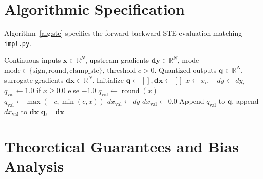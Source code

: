 \documentclass[11pt]{article}
\begin{document}
\section{Algorithmic Specification}
\label{sec:algorithm}

Algorithm~\ref{alg:ste} specifies the forward-backward STE evaluation matching \texttt{impl.py}.

\begin{algorithm}[H]
\caption{Straight-Through Estimator (STE) Evaluation}
\label{alg:ste}
\begin{algorithmic}[1]
\Require Continuous inputs $\mathbf{x} \in \mathbb{R}^N$, upstream gradients $\mathbf{dy} \in \mathbb{R}^N$, mode $\mathrm{mode} \in \{\text{sign}, \text{round}, \text{clamp\_ste}\}$, threshold $c > 0$.
\Ensure Quantized outputs $\mathbf{q} \in \mathbb{R}^N$, surrogate gradients $\mathbf{dx} \in \mathbb{R}^N$.
\State Initialize $\mathbf{q} \gets [], \mathbf{dx} \gets []$
    \State $x \gets x_i, \quad dy \gets dy_i$
        \State $q_{\mathrm{val}} \gets 1.0$ if $x \ge 0.0$ else $-1.0$
        \State $q_{\mathrm{val}} \gets \operatorname{round}(x)$
        \State $q_{\mathrm{val}} \gets \max(-c, \min(c, x))$
    \EndIf
        \State $dx_{\mathrm{val}} \gets dy$
    \Else
        \State $dx_{\mathrm{val}} \gets 0.0$
    \EndIf
    \State Append $q_{\mathrm{val}}$ to $\mathbf{q}$, append $dx_{\mathrm{val}}$ to $\mathbf{dx}$
\EndFor
\State \Return $\mathbf{q}, \quad \mathbf{dx}$
\end{algorithmic}
\end{algorithm}

\section{Theoretical Guarantees and Bias Analysis}
\label{sec:guarantees}
\end{document}
